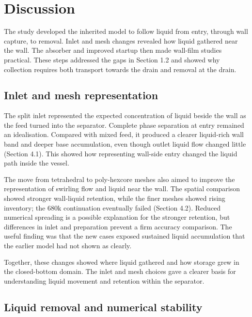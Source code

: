 \documentclass[12pt]{article}
\begin{document}
\section{Discussion}\label{discussion}

The study developed the inherited model to follow liquid from entry, through wall capture, to removal. Inlet and mesh changes revealed how liquid gathered near the wall. The absorber and improved startup then made wall-film studies practical. These steps addressed the gaps in Section 1.2 and showed why collection requires both transport towards the drain and removal at the drain.

\subsection{Inlet and mesh representation}\label{inlet-and-mesh-representation}

The split inlet represented the expected concentration of liquid beside the wall as the feed turned into the separator. Complete phase separation at entry remained an idealisation. Compared with mixed feed, it produced a clearer liquid-rich wall band and deeper base accumulation, even though outlet liquid flow changed little (Section 4.1). This showed how representing wall-side entry changed the liquid path inside the vessel.

The move from tetrahedral to poly-hexcore meshes also aimed to improve the representation of swirling flow and liquid near the wall. The spatial comparison showed stronger wall-liquid retention, while the finer meshes showed rising inventory; the 680k continuation eventually failed (Section 4.2). Reduced numerical spreading is a possible explanation for the stronger retention, but differences in inlet and preparation prevent a firm accuracy comparison. The useful finding was that the new cases exposed sustained liquid accumulation that the earlier model had not shown as clearly.

Together, these changes showed where liquid gathered and how storage grew in the closed-bottom domain. The inlet and mesh choices gave a clearer basis for understanding liquid movement and retention within the separator.

\subsection{Liquid removal and numerical stability}\label{liquid-removal-and-numerical-stability}
\end{document}

